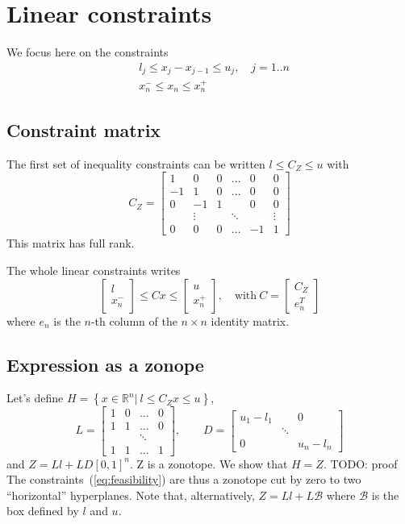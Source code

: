 \documentclass[]{article}
\newcommand{\BIN}{\begin{bmatrix}}
\newcommand{\BOUT}{\end{bmatrix}}
\begin{document}
\section{Linear constraints}
We focus here on the constraints
\begin{align*}
 & l_j \leq x_j - x_{j-1} \leq u_j, \quad j=1..n \label{eq:inequality}\\
 & x_n^- \leq x_n \leq x_n^+
\end{align*}

\subsection{Constraint matrix}
The first set of inequality constraints can be written $l \leq C_Z \leq u$ with
\begin{equation}
  C_Z = \BIN  1 &  0 & 0 & \ldots &  0 & 0\\
             -1 &  1 & 0 & \ldots &  0 & 0\\
              0 & -1 & 1 &        &  0 & 0\\
                & \vdots &&\ddots &    & \vdots \\
              0 &  0 & 0 & \ldots & -1 & 1\BOUT 
\end{equation}
This matrix has full rank.

The whole linear constraints writes
\begin{equation}
  \BIN l \\ x_n^- \BOUT \leq C x \leq \BIN u \\ x_n^+ \BOUT, \quad \mbox{with}\ C = \BIN C_Z \\ e_n^T\BOUT
  \label{eq:feasibility}
\end{equation}
where $e_n$ is the $n$-th column of the $n\times n$ identity matrix.

\subsection{Expression as a zonope}
Let's define $H = \left\{x \in \mathbb{R}^n \vert\ l \leq C_Z x \leq u\right\}$, 
\begin{equation}
L = \BIN 1 & 0 & \ldots & 0 \\ 1 & 1 &\ldots & 0 \\ & & \ddots & \\ 1 & 1 &\ldots & 1\BOUT, \qquad D = \BIN u_1 - l_1 & & 0 \\ & \ddots & \\ 0 & & u_n - l_n\BOUT
\end{equation}
and $Z = Ll + LD \left[0,1\right]^n$. Z is a zonotope. We show that $H = Z$.\newline
TODO: proof
\newline
The constraints~(\ref{eq:feasibility}) are thus a zonotope cut by zero to two ``horizontal'' hyperplanes.
Note that, alternatively, $Z = Ll + L \mathcal{B}$ where $\mathcal{B}$ is the box defined by $l$ and $u$.
\end{document}

